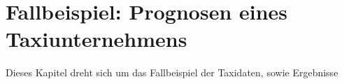 \chapter{Fallbeispiel: Prognosen eines Taxiunternehmens}
Dieses Kapitel dreht sich um das Fallbeispiel der Taxidaten, sowie Ergebnisse






